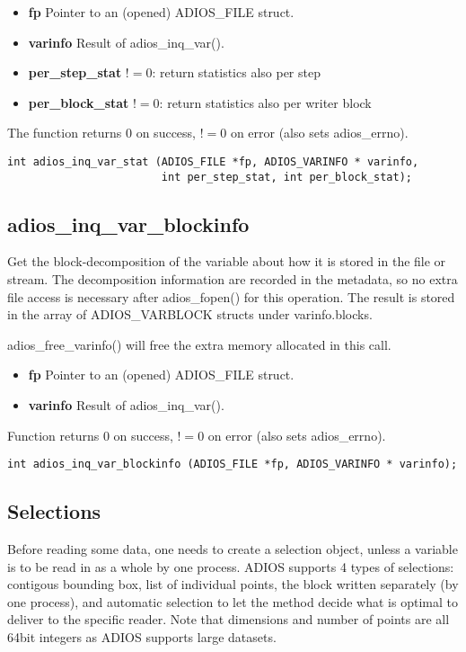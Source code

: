 \begin{itemize}
\item{\bf fp}  Pointer to an (opened) ADIOS\_FILE struct.
\item{\bf  varinfo}        Result of adios\_inq\_var(). 
\item{\bf per\_step\_stat}  $!=0$: return statistics also per step
\item{\bf per\_block\_stat} $!=0$: return statistics also per writer block 
\end{itemize}

\noindent The function returns 0 on success, $!=0$ on error (also sets adios\_errno). 

\begin{lstlisting}[alsolanguage=C]
int adios_inq_var_stat (ADIOS_FILE *fp, ADIOS_VARINFO * varinfo,
                        int per_step_stat, int per_block_stat);
\end{lstlisting}

\subsection{adios\_inq\_var\_blockinfo}
Get the block-decomposition of the variable about how it is stored in 
the file or stream. The decomposition information are recorded in the
metadata, so no extra file access is necessary after adios\_fopen() for 
this operation. The result is stored in the array of 
ADIOS\_VARBLOCK structs under varinfo.blocks. 

adios\_free\_varinfo() will free the extra memory allocated in this call.
\begin{itemize} 
\item{\bf fp}       Pointer to an (opened) ADIOS\_FILE struct.
\item{\bf varinfo}  Result of adios\_inq\_var(). 
\end{itemize}
Function returns 0 on success, $!=0$ on error (also sets adios\_errno).

\begin{lstlisting}[alsolanguage=C]
int adios_inq_var_blockinfo (ADIOS_FILE *fp, ADIOS_VARINFO * varinfo);
\end{lstlisting}


%
%
\subsection{Selections}
Before reading some data, one needs to create a selection object, unless a variable is to be read in 
as a whole by one process. ADIOS supports 4 types of selections: contigous bounding box, list of 
individual points, the block written separately (by one process), and automatic selection to let the 
method decide what is optimal to deliver to the specific reader. Note that dimensions and number 
of points are all 64bit integers as ADIOS supports large datasets. 

